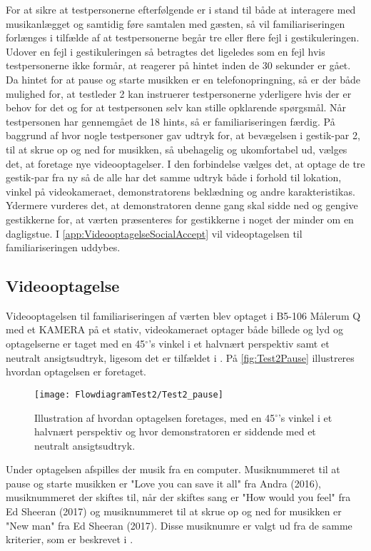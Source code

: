 For at sikre at testpersonerne efterfølgende er i stand til både at interagere med musikanlægget og samtidig føre samtalen med gæsten, så vil familiariseringen forlænges i tilfælde af at testpersonerne begår tre eller flere fejl i gestikuleringen. Udover en fejl i gestikuleringen så betragtes det ligeledes som en fejl hvis testpersonerne ikke formår, at reagerer på hintet inden de 30 sekunder er gået. Da hintet for at pause og starte musikken er en telefonopringning, så er der både mulighed for, at testleder 2 kan instruerer testpersonerne yderligere hvis der er behov for det og for at testpersonen selv kan stille opklarende spørgsmål. Når testpersonen har gennemgået de 18 hints, så er familiariseringen færdig.\blankline
%
På baggrund af  hvor nogle testpersoner gav udtryk for, at bevægelsen i gestik-par 2, til at skrue op og ned for musikken, så ubehagelig og ukomfortabel ud, vælges det, at foretage nye videooptagelser. I den forbindelse vælges det, at optage de tre gestik-par fra ny så de alle har det samme udtryk både i forhold til lokation, vinkel på videokameraet, demonstratorens beklædning og andre karakteristikas. Ydermere vurderes det, at demonstratoren denne gang skal sidde ned og gengive gestikkerne for, at værten præsenteres for gestikkerne i noget der minder om en dagligstue. I \autoref{app:VideooptagelseSocialAccept} vil videoptagelsen til familiariseringen uddybes. 
% 
\subsection{Videooptagelse}
\label{VideooptagelseSocialAccept}
%
Videooptagelsen til familiariseringen af værten blev optaget i B5-106 Målerum Q med et KAMERA på et stativ, videokameraet optager både billede og lyd og optagelserne er taget med en 45$^\circ$'s vinkel i et halvnært perspektiv samt et neutralt ansigtsudtryk, ligesom det er tilfældet i . På \autoref{fig:Test2Pause} illustreres hvordan optagelsen er foretaget. 
%
\begin{figure}[H]
	\centering
	\texttt{[image: FlowdiagramTest2/Test2\_pause]}
	\caption{Illustration af hvordan optagelsen foretages, med en 45$^\circ$'s vinkel i et halvnært perspektiv og hvor demonstratoren er siddende med et neutralt ansigtsudtryk.}
	\label{fig:Test2Pause}
\end{figure}
\noindent
%
Under optagelsen afspilles der musik fra en computer. Musiknummeret til at pause og starte musikken er "Love you can save it all" fra Andra (2016), musiknummeret der skiftes til, når der skiftes sang er "How would you feel" fra Ed Sheeran (2017) og musiknummeret til at skrue op og ned for musikken er "New man" fra Ed Sheeran (2017). Disse musiknumre er valgt ud fra de samme kriterier, som er beskrevet i .

